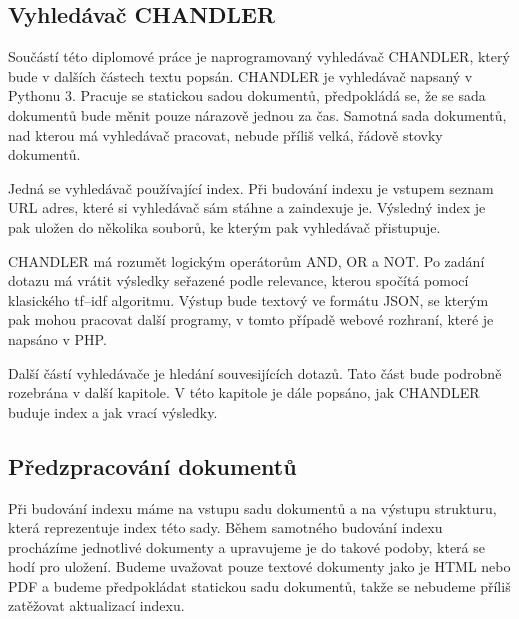 \documentclass[12pt]{article}
\newcommand{\name}{CHANDLER}
\begin{document}
\subsection{Vyhledávač \name}

Součástí této diplomové práce je naprogramovaný vyhledávač \name, který bude v dalších částech textu popsán. \name{} je vyhledávač napsaný v Pythonu 3. Pracuje se statickou sadou dokumentů, předpokládá se, že se sada dokumentů bude měnit pouze nárazově jednou za čas. Samotná sada dokumentů, nad kterou má vyhledávač pracovat, nebude příliš velká, řádově stovky dokumentů. 

Jedná se vyhledávač používající index. Při budování indexu je vstupem seznam URL adres, které si vyhledávač sám stáhne a zaindexuje je. Výsledný index je pak uložen do několika souborů, ke kterým pak vyhledávač přistupuje. 

\name{} má rozumět logickým operátorům AND, OR a NOT. Po zadání dotazu má vrátit výsledky seřazené podle relevance, kterou spočítá pomocí klasického tf–idf algoritmu. Výstup bude textový ve formátu JSON, se kterým pak mohou pracovat další programy, v tomto případě webové rozhraní, které je napsáno v PHP. 

Další částí vyhledávače je hledání souvesijících dotazů. Tato část bude podrobně rozebrána v další kapitole. V této kapitole je dále popsáno, jak \name{} buduje index a jak vrací výsledky. 



\subsection{Předzpracování dokumentů}
\label{prepr}
Při budování indexu máme na vstupu sadu dokumentů a na výstupu strukturu, která reprezentuje index této sady. Během samotného budování indexu procházíme jednotlivé dokumenty a upravujeme je do takové podoby, která se hodí pro uložení. Budeme uvažovat pouze textové dokumenty jako je HTML nebo PDF a budeme předpokládat statickou sadu dokumentů, takže se nebudeme příliš zatěžovat aktualizací indexu. 
\end{document}
